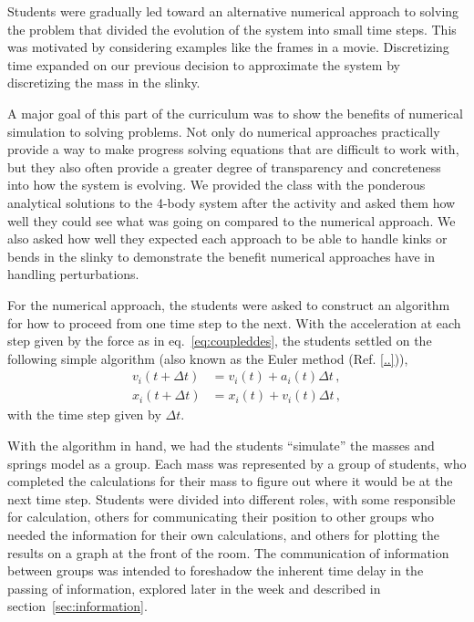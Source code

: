 \documentclass[aps,pre,10pt,superscriptaddress,showpacs,amsmath,amssymb,nofootinbib]{revtex4-1}
\newcommand{\eq}[1]{eq.~\eqref{eq:#1}}
\renewcommand{\sec}[1]{section~\ref{sec:#1}}
\newcommand{\nn}{\nonumber}
\begin{document}
Students were gradually led toward an alternative numerical approach to solving
the problem that divided the evolution of the system into small time
steps. This was motivated by considering examples like the frames in a
movie. Discretizing time expanded on our previous decision to approximate the
system by discretizing the mass in the slinky.

A major goal of this part of the curriculum was to show the benefits of
numerical simulation to solving problems. Not only do numerical approaches
practically provide a way to make progress solving equations that are difficult
to work with, but they also often provide a greater degree of transparency and
concreteness into how the system is evolving. We provided the class with the
ponderous analytical solutions to the 4-body system after the activity and asked
them how well they could see what was going on compared to the numerical
approach. We also asked how well they expected each approach to be able to
handle kinks or bends in the slinky to demonstrate the benefit numerical
approaches have in handling perturbations.

For the numerical approach, the students were asked to construct an algorithm
for how to proceed from one time step to the next. With the acceleration at each
step given by the force as in \eq{coupleddes}, the students settled on the
following simple algorithm (also known as the Euler method (Ref. \ref{..})),
\begin{align} \label{eq:algorithm}
v_i(t+\Delta t) &= v_i(t) + a_i(t)\Delta t
\,,\nn\\
x_i(t+\Delta t) &= x_i(t) + v_i(t)\Delta t
\,,\end{align}
with the time step given by $\Delta t$.

With the algorithm in hand, we had the students ``simulate'' the masses and
springs model as a group. Each mass was represented by a group of 
students, who completed the calculations for their mass to figure out where it would be
at the next time step. Students were divided into different roles, with some responsible 
for calculation, others for communicating their position to other groups who 
needed the information for their own calculations, and others for plotting the results on a graph 
at the front of the room. The communication of information between groups was intended 
to foreshadow the inherent time delay in the passing of information, explored later in
the week and described in \sec{information}.
\end{document}
